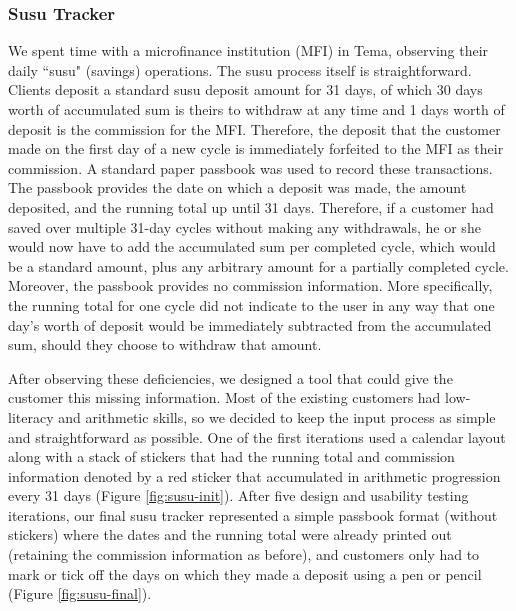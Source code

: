 \documentclass{sig-alternate}
\begin{document}
\subsubsection{Susu Tracker}
We spent time with a microfinance institution (MFI) in Tema, observing their daily ``susu" (savings) operations. The susu process itself is straightforward. Clients deposit a standard susu deposit amount for 31 days, of which 30 days worth of accumulated sum is theirs to withdraw at any time and 1 days worth of deposit is the commission for the MFI. Therefore, the deposit that the customer made on the first day of a new cycle is immediately forfeited to the MFI as their commission. A standard paper passbook was used to record these transactions. The passbook provides the date on which a deposit was made, the amount deposited, and the running total up until 31 days. Therefore, if a customer had saved over multiple 31-day cycles without making any withdrawals, he or she would now have to add the accumulated sum per completed cycle, which would be a standard amount, plus any arbitrary amount for a partially completed cycle. Moreover, the passbook provides no commission information. More specifically, the running total for one cycle did not indicate to the user in any way that one day's worth of deposit would be immediately subtracted from the accumulated sum, should they choose to withdraw that amount.

After observing these deficiencies, we designed a tool that could give the customer this missing information. Most of the existing customers had low-literacy and arithmetic skills, so we decided to keep the input process as simple and straightforward as possible. One of the first iterations used a calendar layout along with a stack of stickers that had the running total and commission information denoted by a red sticker that accumulated in arithmetic progression every 31 days (Figure \ref{fig:susu-init}). After five design and usability testing iterations, our final susu tracker represented a simple passbook format (without stickers) where the dates and the running total were already printed out (retaining the commission information as before), and customers only had to mark or tick off the days on which they made a deposit using a pen or pencil (Figure \ref{fig:susu-final}).
\end{document}
